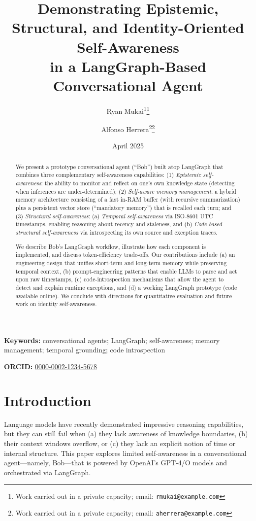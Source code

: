 \documentclass[11pt]{article}
\title{Demonstrating Epistemic, Structural, and Identity-Oriented Self-Awareness \\in a LangGraph-Based Conversational Agent}
\author{
  Ryan Mukai\textsuperscript{1}\thanks{Work carried out in a private capacity; email: \texttt{rmukai@example.com}} 
  \and
  Alfonso Herrera\textsuperscript{2}\thanks{Work carried out in a private capacity; email: \texttt{aherrera@example.com}}
}
\date{April 2025}
\begin{document}
\maketitle

\begin{abstract}
We present a prototype conversational agent (“Bob”) built atop LangGraph that combines three complementary self-awareness capabilities:
(1) \emph{Epistemic self-awareness}: the ability to monitor and reflect on one’s own knowledge state (detecting when inferences are under-determined);
(2) \emph{Self-aware memory management}: a hybrid memory architecture consisting of a fast in-RAM buffer (with recursive summarization) plus a persistent vector store (“mandatory memory”) that is recalled each turn; and
(3) \emph{Structural self-awareness}: (a) \emph{Temporal self-awareness} via ISO-8601 UTC timestamps, enabling reasoning about recency and staleness, and (b) \emph{Code-based structural self-awareness} via introspecting its own source and exception traces.

We describe Bob’s LangGraph workflow, illustrate how each component is implemented, and discuss token-efficiency trade-offs. Our contributions include (a) an engineering design that unifies short-term and long-term memory while preserving temporal context, (b) prompt-engineering patterns that enable LLMs to parse and act upon raw timestamps, (c) code-introspection mechanisms that allow the agent to detect and explain runtime exceptions, and (d) a working LangGraph prototype (code available online). We conclude with directions for quantitative evaluation and future work on identity self-awareness.
\end{abstract}

\textbf{Keywords:} conversational agents; LangGraph; self-awareness; memory management; temporal grounding; code introspection

\vspace{1em}
\noindent\textbf{ORCID:} \href{https://orcid.org/0000-0002-1234-5678}{0000-0002-1234-5678}

\section{Introduction}
Language models have recently demonstrated impressive reasoning capabilities, but they can still fail when (a) they lack awareness of knowledge boundaries, (b) their context windows overflow, or (c) they lack an explicit notion of time or internal structure. This paper explores limited self-awareness in a conversational agent—namely, Bob—that is powered by OpenAI’s GPT-4/O models and orchestrated via LangGraph.
\end{document}
